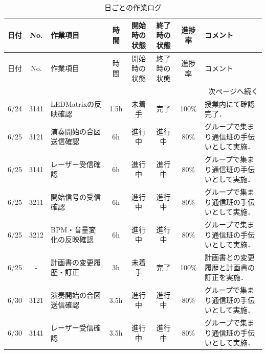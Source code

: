 \documentclass[uplatex,dvipdfmx,a4paper,11pt]{jsarticle}
\begin{document}
    \renewcommand{\arraystretch}{1.2}

    \small

    \begin{longtable}{|c|c|p{2.4cm}|c|c|c|c|p{3.8cm}|}
    \caption{日ごとの作業ログ} \\
    \hline
    日付 & No. & 作業項目 & 時間 & 開始時の状態 & 終了時の状態 & 進捗率 & コメント \\
    \hline
    \endfirsthead

    \hline
    日付 & No. & 作業項目 & 時間 & 開始時の状態 & 終了時の状態 & 進捗率 & コメント \\
    \hline
    \endhead

    \hline
    \multicolumn{8}{r}{次ページへ続く} \\
    \hline
    \endfoot

    \hline
    \endlastfoot

    6/24 & 3141 & LEDMatrixの反映確認 & 1.5h &
    未着手 &
    完了 &
    100\% &
    授業内にて確認完了．\\
    \hline

    6/25 & 3121 & 演奏開始の合図送信確認 & 6h &
    進行中 &
    進行中 &
    80\% &
    グループで集まり通信班の手伝いとして実施．\\
    \hline

    6/25 & 3141 & レーザー受信確認 & 6h &
    進行中 &
    進行中 &
    80\% &
    グループで集まり通信班の手伝いとして実施．\\
    \hline

    6/25 & 3211 & 開始信号の受信確認 & 6h &
    進行中 &
    進行中 &
    80\% &
    グループで集まり通信班の手伝いとして実施．\\
    \hline

    6/25 & 3212 & BPM・音量変化の反映確認 & 6h &
    進行中 &
    進行中 &
    80\% &
    グループで集まり通信班の手伝いとして実施．\\
    \hline

    6/25 & - & 計画書の変更履歴・訂正 & 3h &
    未着手 &
    完了 &
    100\% &
    計画書との変更履歴と計画書の訂正を実施．\\
    \hline

    6/30 & 3121 & 演奏開始の合図送信確認 & 3.5h &
    進行中 &
    進行中 &
    80\% &
    グループで集まり通信班の手伝いとして実施．\\
    \hline

    6/30 & 3141 & レーザー受信確認 & 3.5h &
    進行中 &
    進行中 &
    80\% &
    グループで集まり通信班の手伝いとして実施．\\
    \hline


\end{longtable}
\end{document}
